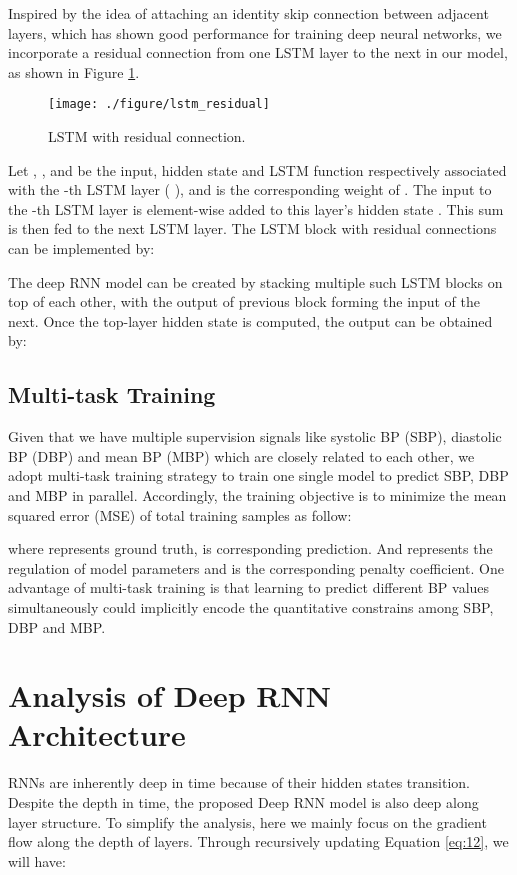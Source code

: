 \documentclass[letterpaper, 10 pt, conference]{ieeeconf}
\begin{document}
Inspired by the idea of attaching an identity skip connection between adjacent layers, which
has shown good performance for training deep neural networks\cite{he2016deep}\cite{srivastava2015highway}\cite{wu2016google},
we incorporate a residual connection from one LSTM layer to the next in our model, as shown in Figure \ref{fig:residual}.
\begin{figure}[h]
\centering
\texttt{[image: ./figure/lstm\_residual]}
\caption{LSTM with residual connection.}
\label{fig:residual}
\end{figure}
Let , , and  be the input, hidden state and LSTM function respectively associated with the -th LSTM layer ( ), and  is the corresponding weight of  .
The input to the -th LSTM layer  is element-wise added to this layer's hidden state . This sum  is then fed to the next LSTM layer.
The LSTM block with residual connections can be implemented by:

The deep RNN model can be created by stacking multiple such LSTM blocks on top of each other, with the output of previous block  forming the input of the next.
Once the top-layer hidden state is computed, the output  can be obtained by:
 


\subsection{Multi-task Training}
Given that we have multiple supervision signals like systolic BP (SBP), diastolic BP (DBP) and mean BP (MBP) which are closely related to each other,
we adopt multi-task training strategy to train one single model to predict SBP, DBP and MBP in parallel. 
Accordingly, the training objective is to minimize the mean squared error (MSE) of total  training samples as follow:

where  represents ground truth,  is corresponding prediction.
And  represents the  regulation of model parameters and  is the corresponding penalty coefficient.
One advantage of multi-task training is that learning to predict different BP values simultaneously could implicitly encode the quantitative constrains among SBP, DBP and MBP.

\section{Analysis of Deep RNN Architecture} \label{sec:analysis}
RNNs are inherently deep in time because of their hidden states transition.
Despite the depth in time, the proposed Deep RNN model is also deep along layer structure.
To simplify the analysis, here we mainly focus on the gradient flow along the depth of layers.
Through recursively updating Equation \ref{eq:12}, we will have:
\end{document}
